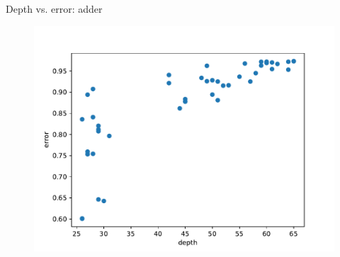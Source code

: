 \documentclass{beamer}
\begin{document}
\begin{frame}{Depth vs. error: adder}
	\begin{figure}[h]
		\centering
		\includegraphics[width=0.8\linewidth]{./figs/adder_error2.pdf}
	\end{figure}
\end{frame}
\end{document}
